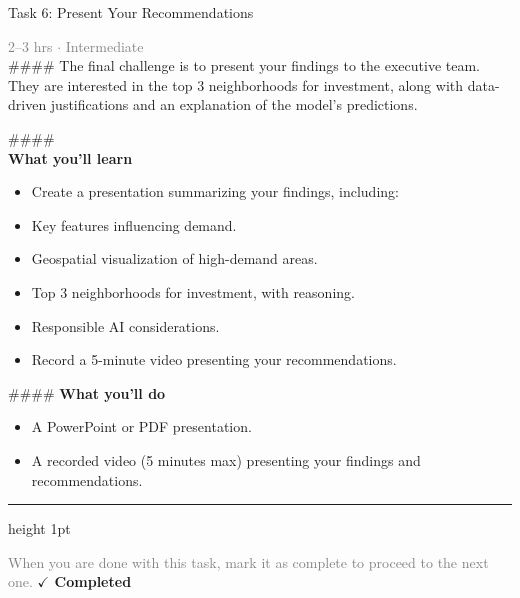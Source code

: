 \documentclass[10pt,a4paper]{article}
\begin{document}
\begin{taskbox}{Task 6: Present Your Recommendations}

    {\small \textcolor{gray}{2--3 hrs $\cdot$ Intermediate}}\\[12pt]

    \#\#\#\# 
The final challenge is to present your findings to the executive team. They are interested in the top 3 neighborhoods for investment, along with data-driven justifications and an explanation of the model’s predictions.

\#\#\#\# \\[10pt]
\vspace{8pt}
{\large \textbf{\textcolor{brandLight}{What you'll learn}}}\\[4pt]
\begin{itemize}
    \item Create a presentation summarizing your findings, including:
    \item Key features influencing demand.
    \item Geospatial visualization of high-demand areas.
    \item Top 3 neighborhoods for investment, with reasoning.
    \item Responsible AI considerations.
    \item Record a 5-minute video presenting your recommendations.
\end{itemize}

\#\#\#\# \vspace{8pt}
{\large \textbf{\textcolor{brandLight}{What you'll do}}}\\[4pt]
\begin{itemize}
    \item A PowerPoint or PDF presentation.
    \item A recorded video (5 minutes max) presenting your findings and recommendations.\par
\end{itemize}

    \vspace{16pt}

    \textcolor{cardBorder}{\hrule height 1pt}\vspace{8pt}

    \small \textcolor{gray}{When you are done with this task, mark it as complete to proceed to the next one.} \hfill \textbf{\textcolor{brandDark}{$\checkmark$ Completed}}

\end{taskbox}
\end{document}
